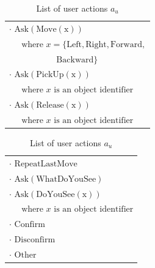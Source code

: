 \begin{table}[p]
\begin{footnotesize}
\begin{tabular}{p{60mm}} 
$\cdot$ $\mathrm{Ask(Move(x))} $ \\ $ \ \ \ \ \ \text{ where } x=\{\mathrm{Left,Right,Forward,}$ \\ $\ \ \ \ \ \ \ \ \ \ \ \ \ \ \ \ \ \ \ \ \ \ \ \ \ \mathrm{Backward}\} $ \\ 
$\cdot$ $\mathrm{Ask(PickUp(x))} $ \\ $\ \ \ \ \  \text{ where } x \text{ is an object identifier}$ \\
$\cdot$ $\mathrm{Ask(Release(x))} $ \\ $\ \ \ \ \  \text{ where } x \text{ is an object identifier}$ 
\end{tabular}
\hspace{2cm}
\begin{tabular}{p{60mm}} 
$\cdot$ $\mathrm{RepeatLastMove}$ \\
$\cdot$ $\mathrm{Ask(WhatDoYouSee)}$ \\
$\cdot$ $\mathrm{Ask(DoYouSee(x))} $ \\ $\ \ \ \ \  \text{ where } x \text{ is an object identifier}$ \\
$\cdot$ $\mathrm{Confirm}$ \\
$\cdot$ $\mathrm{Disconfirm}$ \\
$\cdot$ $\mathrm{Other}$ 
\end{tabular}
\end{footnotesize}
 \caption{List of user actions $a_u$} 
\label{table:userdas_exp2}
\end{table}

